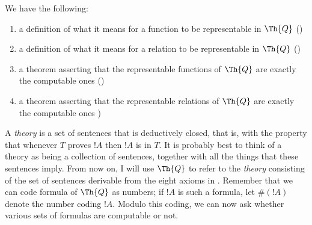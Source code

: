 \documentclass[../../include/open-logic-section]{subfiles}
\begin{document}


We have the following:
\begin{enumerate}
\item a definition of what it means for a function to be representable
  in $\Th{Q}$ ()
\item a definition of what it means for a relation to be representable
  in $\Th{Q}$ ()
\item a theorem asserting that the representable functions of $\Th{Q}$
  are exactly the computable ones
  ()
\item a theorem asserting that the representable relations of $\Th{Q}$
  are exactly the computable ones
  )
\end{enumerate}

A {\em theory} is a set of sentences that is deductively closed, that
is, with the property that whenever $T$ proves $!A$ then $!A$ is in
$T$. It is probably best to think of a theory as being a collection of
sentences, together with all the things that these sentences imply.
From now on, I will use $\Th{Q}$ to refer to the {\em theory}
consisting of the set of sentences derivable from the eight axioms in
.  Remember that we can code formula of $\Th{Q}$
as numbers; if $!A$ is such a formula, let $\#(!A)$ denote the number
coding $!A$. Modulo this coding, we can now ask whether various sets
of formulas are computable or not.
\end{document}
